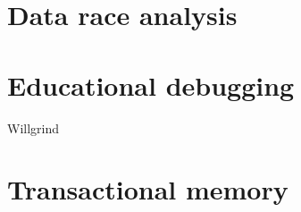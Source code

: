 

\section{Data race analysis}

\section{Educational debugging}

Willgrind \cite{willgrind}

\section{Transactional memory}



